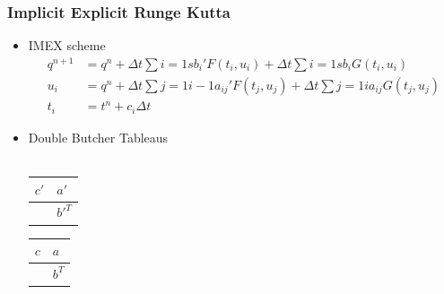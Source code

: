 \documentclass[10pt]{beamer}
\begin{document}
\begin{frame}
  \frametitle{Implicit Explicit Runge Kutta}
  \begin{itemize}
    \item IMEX scheme
          \begin{align*}
            q^{n+1} & = q^n + \Delta t \sum{i = 1}{s}{b_i' F(t_i, u_i)} + \Delta t \sum{i=1}{s}{b_i G(t_i, u_i)}         \\
            u_i     & = q^n + \Delta t \sum{j = 1}{i-1}{a_{ij}' F(t_j, u_j)} + \Delta t \sum{j=1}{i}{a_{ij} G(t_j, u_j)} \\
            t_i     & = t^n + c_i \Delta t
          \end{align*}

    \item Double Butcher Tableaus \hfill \\ \hfill \\
          \begin{tabular}{r|l}
            \(c'\) & \(a'\)   \\
            \midrule
                   & \(b'^T\)
          \end{tabular}
          \begin{tabular}{r|l}
            \(c\) & \(a\)   \\
            \midrule
                  & \(b^T\)
          \end{tabular}
  \end{itemize}
\end{frame}
\end{document}
